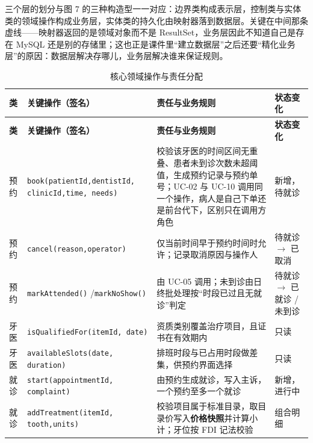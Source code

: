 \documentclass[11pt,a4paper]{ctexart}
\newcommand{\figtag}[1]{%
  \tikz[baseline=-0.35ex]{\node[fill=adcblue!90,text=white,rounded corners=1.5pt,
    inner xsep=5pt,inner ysep=1.2pt,font=\scriptsize\bfseries]{#1};}\hspace{2pt}}
\begin{document}
\figtag{图 13 说明} 三个层的划分与图 7 的三种构造型一一对应：边界类构成表示层，控制类与实体类的领域操作构成业务层，实体类的持久化由映射器落到数据层。关键在中间那条虚线——映射器返回的是领域对象而不是 ResultSet，业务层因此不知道自己是存在 MySQL 还是别的存储里；这也正是课件里“建立数据层”之后还要“精化业务层”的原因：数据层解决存哪儿，业务层解决谁来保证规则。

\begin{longtable}{@{}L{2.0cm}L{4.2cm}L{4.2cm}L{3.8cm}@{}}
\caption{核心领域操作与责任分配}\\
\toprule
\textbf{\textcolor{adcblue!92}{类}} & \textbf{\textcolor{adcblue!92}{关键操作（签名）}} & \textbf{\textcolor{adcblue!92}{责任与业务规则}} & \textbf{\textcolor{adcblue!92}{状态变化}} \\
\midrule
\endfirsthead
\toprule
\textbf{\textcolor{adcblue!92}{类}} & \textbf{\textcolor{adcblue!92}{关键操作（签名）}} & \textbf{\textcolor{adcblue!92}{责任与业务规则}} & \textbf{\textcolor{adcblue!92}{状态变化}} \\
\midrule
\endhead
\bottomrule
\endfoot
预约 & \texttt{book(patientId,}\newline \texttt{dentistId, clinicId,}\newline \texttt{time, needs)} & 校验该牙医的时间区间无重叠、患者未到诊次数未超阈值，生成预约记录与预约单号；UC-02 与 UC-10 调用同一个操作，病人是自己下单还是前台代下，区别只在调用方角色 & 新增，待就诊 \\
预约 & \texttt{cancel(reason,}\newline \texttt{operator)} & 仅当前时间早于预约时间时允许；记录取消原因与操作人 & 待就诊 $\rightarrow$ 已取消 \\
预约 & \texttt{markAttended()} /\newline \texttt{markNoShow()} & 由 UC-05 调用；未到诊由日终批处理按“时段已过且无就诊”判定 & 待就诊 $\rightarrow$ 已就诊 / 未到诊 \\
牙医 & \texttt{isQualifiedFor}\newline \texttt{(itemId, date)} & 资质类别覆盖治疗项目，且证书在有效期内 & 只读 \\
牙医 & \texttt{availableSlots}\newline \texttt{(date, duration)} & 排班时段与已占用时段做差集，供预约界面选择 & 只读 \\
就诊 & \texttt{start}\newline \texttt{(appointmentId, complaint)} & 由预约生成就诊，写入主诉，一个预约至多一个就诊 & 新增，进行中 \\
就诊 & \texttt{addTreatment}\newline \texttt{(itemId, tooth,}\newline \texttt{units)} & 校验项目属于标准目录，取目录价写入\textbf{价格快照}并计算小计；牙位按 FDI 记法校验 & 组合明细 \\

\end{longtable}
\end{document}
